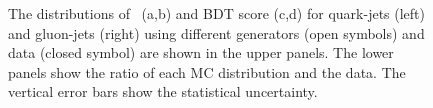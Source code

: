 \begin{figure}[htb]
	\caption[]{
		The distributions of \ntrk~(a,b) and BDT score (c,d) for quark-jets (left) and gluon-jets (right) using different generators (open symbols) and data (closed symbol) are shown in the upper panels. The lower panels show the ratio of each MC distribution and the data. The vertical error bars show the statistical uncertainty.%
		\label{fig:QG-roc-com121}
	}
\end{figure}


